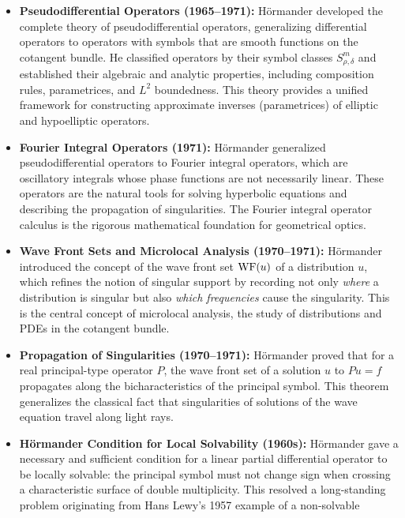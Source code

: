 \begin{itemize}
    \item \textbf{Pseudodifferential Operators (1965--1971):} H\"ormander
    developed the complete theory of pseudodifferential operators,
    generalizing differential operators to operators with symbols that
    are smooth functions on the cotangent bundle. He classified operators
    by their symbol classes \(S^m_{\rho,\delta}\) and established their
    algebraic and analytic properties, including composition rules,
    parametrices, and \(L^2\) boundedness. This theory provides a unified
    framework for constructing approximate inverses (parametrices) of
    elliptic and hypoelliptic operators.
    \item \textbf{Fourier Integral Operators (1971):} H\"ormander
    generalized pseudodifferential operators to Fourier integral
    operators, which are oscillatory integrals whose phase functions are
    not necessarily linear. These operators are the natural tools for
    solving hyperbolic equations and describing the propagation of
    singularities. The Fourier integral operator calculus is the
    rigorous mathematical foundation for geometrical optics.
    \item \textbf{Wave Front Sets and Microlocal Analysis (1970--1971):}
    H\"ormander introduced the concept of the wave front set
    \(\operatorname{WF}(u)\) of a distribution \(u\), which refines the notion of
    singular support by recording not only \textit{where} a distribution
    is singular but also \textit{which frequencies} cause the
    singularity. This is the central concept of microlocal analysis, the
    study of distributions and PDEs in the cotangent bundle.
    \item \textbf{Propagation of Singularities (1970--1971):}
    H\"ormander proved that for a real principal-type operator \(P\),
    the wave front set of a solution \(u\) to \(Pu = f\) propagates along
    the bicharacteristics of the principal symbol. This theorem
    generalizes the classical fact that singularities of solutions of
    the wave equation travel along light rays.
    \item \textbf{H\"ormander Condition for Local Solvability (1960s):}
    H\"ormander gave a necessary and sufficient condition for a linear
    partial differential operator to be locally solvable: the principal
    symbol must not change sign when crossing a characteristic surface
    of double multiplicity. This resolved a long-standing problem
    originating from Hans Lewy's 1957 example of a non-solvable

\end{itemize}
